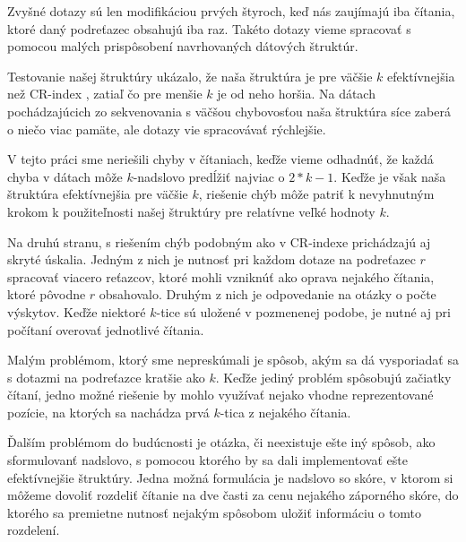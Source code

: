 Zvyšné dotazy sú len modifikáciou prvých štyroch, keď nás zaujímajú iba čítania,
ktoré daný podreťazec obsahujú iba raz. Takéto dotazy vieme spracovať s pomocou
malých prispôsobení navrhovaných dátových štruktúr.

Testovanie našej štruktúry ukázalo, že naša štruktúra je pre
väčšie $k$ efektívnejšia než CR-index \cite{cr_index}, zatiaľ čo pre menšie $k$
je od neho horšia. Na dátach pochádzajúcich zo sekvenovania s väčšou chybovosťou naša štruktúra síce zaberá
o niečo viac pamäte, ale dotazy vie spracovávať rýchlejšie.

V tejto práci sme neriešili chyby v čítaniach, keďže vieme odhadnúť, že každá
chyba v dátach môže $k$-nadslovo predĺžiť najviac o $2*k - 1$. Keďže je však
naša štruktúra efektívnejšia pre väčšie $k$, riešenie chýb môže patriť
k nevyhnutným krokom k použiteľnosti našej štruktúry pre relatívne veľké hodnoty $k$.

Na druhú stranu, s riešením chýb podobným ako v CR-indexe prichádzajú aj skryté úskalia. Jedným z nich
je nutnosť pri každom dotaze na podreťazec $r$ spracovať viacero reťazcov,
ktoré mohli vzniknúť ako oprava nejakého čítania, ktoré pôvodne $r$ obsahovalo.
Druhým z nich je odpovedanie na otázky o počte výskytov. Keďže niektoré $k$-tice
sú uložené v pozmenenej podobe, je nutné aj pri počítaní overovať jednotlivé
čítania.

Malým problémom, ktorý sme nepreskúmali je spôsob, akým sa dá vysporiadať sa
s dotazmi na podreťazce kratšie ako $k$. Keďže jediný problém spôsobujú začiatky
čítaní, jedno možné riešenie by mohlo využívať nejako vhodne reprezentované
pozície, na ktorých sa nachádza prvá $k$-tica z nejakého čítania.

Ďalším problémom do budúcnosti je otázka, či neexistuje ešte iný spôsob, ako
sformulovanť nadslovo, s pomocou ktorého by sa dali implementovať
ešte efektívnejšie štruktúry. Jedna možná formulácia je nadslovo so skóre,
v ktorom si môžeme dovoliť rozdeliť čítanie na dve časti za cenu nejakého
záporného skóre, do ktorého sa premietne nutnosť nejakým spôsobom uložiť
informáciu o tomto rozdelení.
